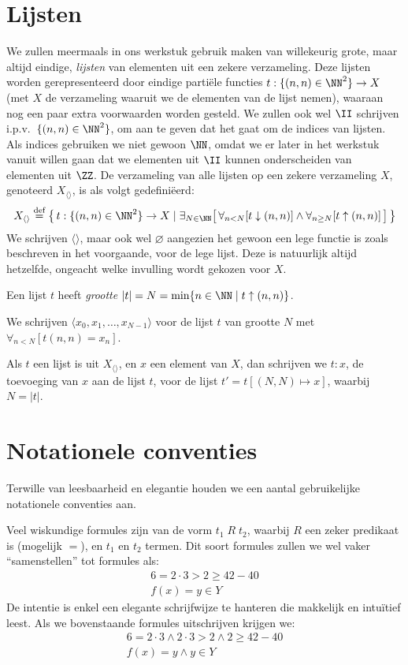 \section{Lijsten}

We zullen meermaals in ons werkstuk gebruik maken van willekeurig grote, maar altijd eindige, \emph{lijsten} van elementen uit een zekere verzameling. Deze lijsten worden gerepresenteerd door eindige partiële functies $t : \{(n, n) \in \NN^2\} \to X$ (met $X$ de verzameling waaruit we de elementen van de lijst nemen), waaraan nog een paar extra voorwaarden worden gesteld. We zullen ook wel $\II$ schrijven i.p.v.~$\{(n, n) \in \NN^2\}$, om aan te geven dat het gaat om de indices van lijsten. Als indices gebruiken we niet gewoon $\NN$, omdat we er later in het werkstuk vanuit willen gaan dat we elementen uit $\II$ kunnen onderscheiden van elementen uit $\ZZ$. De verzameling van alle lijsten op een zekere verzameling $X$, genoteerd $X_{\langle\rangle}$, is als volgt gedefiniëerd:
\begin{equation*}
X_{\langle\rangle} \DEF \big\{\, t : \{(n, n) \in \NN^2\} \to X \mid \exists_{N \in \NN} \surr{ \forall_{n < N}[t \downarrow (n, n)] \land \forall_{n\ge N}[t \uparrow (n, n)] } \,\big\}
\end{equation*}
We schrijven $\langle\rangle$, maar ook wel $\varnothing$ aangezien het gewoon een lege functie is zoals beschreven in het voorgaande, voor de lege lijst. Deze is natuurlijk altijd hetzelfde, ongeacht welke invulling wordt gekozen voor $X$.

Een lijst $t$ heeft \emph{grootte} $|t| = N = \min\{n\in\NN \mid t \uparrow (n, n)\}$.

We schrijven $\langle x_0, x_1, \dots, x_{N-1}\rangle$ voor de lijst $t$ van grootte $N$ met $\forall_{n < N}[t(n, n) = x_n]$.

Als $t$ een lijst is uit $X_{\langle\rangle}$, en $x$ een element van $X$, dan schrijven we $t:x$, de toevoeging van $x$ aan de lijst $t$, voor de lijst $t' = t[(N, N) \mapsto x]$, waarbij $N = |t|$.

\section{Notationele conventies}

Terwille van leesbaarheid en elegantie houden we een aantal gebruikelijke notationele conventies aan.

Veel wiskundige formules zijn van de vorm $t_1\; R\; t_2$, waarbij $R$ een zeker predikaat is (mogelijk $=$), en $t_1$ en $t_2$ termen. Dit soort formules zullen we wel vaker “samenstellen” tot formules als:
\begin{gather*}
  6 = 2 \cdot 3 > 2 \ge 42 - 40 \\
  f(x) = y \in Y
\end{gather*}
De intentie is enkel een elegante schrijfwijze te hanteren die makkelijk en intuïtief leest.
Als we bovenstaande formules uitschrijven krijgen we:
\begin{gather*}
  6 = 2 \cdot 3 \land 2 \cdot 3 > 2 \land 2 \ge 42 - 40 \\
  f(x) = y \land y \in Y
\end{gather*}

